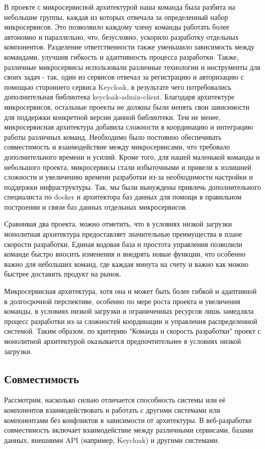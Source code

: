     В проекте с микросервисной архитектурой наша команда была разбита на небольшие группы, каждая из которых отвечала за определенный набор микросервисов. Это позволяило каждому члену команды работать более автономно и параллельно, что, безусловно, ускорило разработку отдельных компонентов. Разделение ответственности также уменьшило зависимость между командами, улучшив гибкость и адаптивность процесса разработки. Также, различные микросервисы использовали различные технологии и инструменты для своих задач - так, один из сервисов отвечал за регистрацию и авторизацию с помощью стороннего сервиса Keycloak, в результате чего потребовались дополнительная библиотека keycloak-admin-client. Благодаря архитектуре микросервисов, остальные проекты не должны были менять свои зависимости для поддержки конкретной версии данной библиотеки. Тем не менее, микросервисная архитектура добавила сложности в координацию и интеграцию работы различных команд. Необходимо было постоянно обеспечивать совместимость и взаимодействие между микросервисами, что требовало дополнительного времени и усилий. Кроме того, для нашей маленькой команды и небольшого проекта, микросервисы стали избыточными и привели к излишней сложности и увеличению времени разработки из-за необходимости настройки и поддержки инфраструктуры. Так, мы были вынуждены привлечь дополнительного специалиста по docker и архитектора баз данных для помощи в правильном построении и связи баз данных отдельных микросервисов.
    
    Сравнивая два проекта, можно отметить, что в условиях низкой загрузки монолитная архитектура предоставляет значительные преимущества в плане скорости разработки. Единая кодовая база и простота управления позволили команде быстро вносить изменения и внедрять новые функции, что особенно важно для небольших команд, где каждая минута на счету и важно как можно быстрее доставить продукт на рынок.
    
    Микросервисная архитектура, хотя она и может быть более гибкой и адаптивной в долгосрочной перспективе, особенно по мере роста проекта и увеличения команды, в условиях низкой загрузки и ограниченных ресурсов лишь замедляла процесс разработки из-за сложностей координации и управления распределенной системой. Таким образом, по критерию "Команда и скорость разработки" проект с монолитной архитектурой оказывается предпочтительнее в условиях низкой загрузки.

\subsection{Совместимость}
    Рассмотрим, насколько сильно отличается способность системы или её компонентов взаимодействовать и работать с другими системами или компонентами без конфликтов в зависимости от архитектуры. В веб-разработке совместимость включает взаимодействие между различными сервисами, базами данных, внешними API (например, Keycloak) и другими системами.

